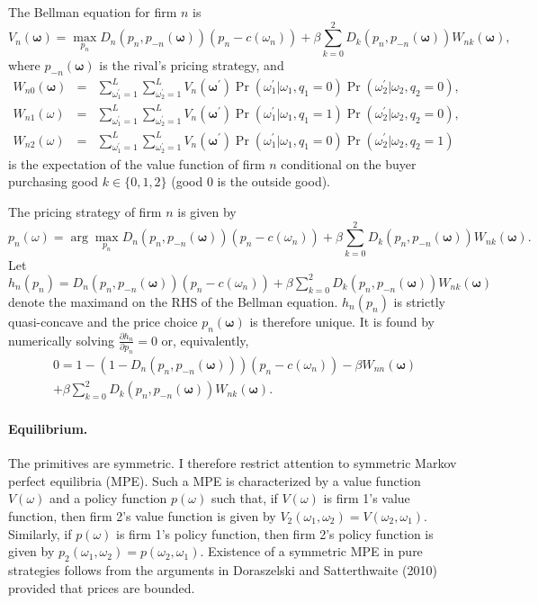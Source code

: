 \documentclass[11pt]{article}
\begin{document}
The Bellman equation for firm $n$ is
\begin{equation*}
V_n(\mathbf{\omega})=\max_{p_n }
D_n(p_n,p_{-n}(\mathbf{\omega}))(p_n-c(\omega_n))+\beta\sum_{k=0}^2D_k(p_n,p_{-n}(\mathbf{\omega}))W_{nk}(\mathbf{\omega}),
\end{equation*}%
where $p_{-n}(\mathbf{\omega})$ is the
rival's pricing strategy, and
\begin{eqnarray*}
W_{n0}(\mathbf{\omega}) & = & \sum_{\omega_1^\prime=1}^L\sum_{\omega_2^\prime=1}^LV_n(\mathbf{\omega}^\prime)\Pr(\omega_1^\prime|\omega_1,q_1=0)\Pr(\omega_2^\prime|\omega_2,q_2=0), \\
W_{n1}(\omega) & = & \sum_{\omega_1^\prime=1}^L\sum_{\omega_2^\prime=1}^LV_n(\mathbf{\omega}^\prime)\Pr(\omega_1^\prime|\omega_1,q_1=1)\Pr(\omega_2^\prime|\omega_2,q_2=0), \\
W_{n2}(\omega) & = & \sum_{\omega_1^\prime=1}^L\sum_{\omega_2^\prime=1}^LV_n(\mathbf{\omega}^\prime)\Pr(\omega_1^\prime|\omega_1,q_1=0)\Pr(\omega_2^\prime|\omega_2,q_2=1)
\end{eqnarray*}
is the expectation of the value function of firm $n$ conditional on the buyer purchasing good $k\in\{0,1,2\}$ (good $0$ is the outside good).

The pricing strategy of firm $n$ is given by
\begin{equation*}
p_n\left( \omega \right)
=\arg\max_{p_n}D_n(p_n,p_{-n}(\mathbf{\omega}))(p_n-c(\omega_n))+\beta\sum_{k=0}^2D_k(p_n,p_{-n}(\mathbf{\omega}))
W_{nk}(\mathbf{\omega}).
\end{equation*}%
Let
$h_n(p_n)=D_n(p_n,p_{-n}(\mathbf{\omega}))(p_n-c(\omega_n))+\beta\sum_{k=0}^2D_k(p_n,p_{-n}(\mathbf{\omega}))W_{nk}(\mathbf{\omega})$
denote the maximand on the RHS of the Bellman equation.
$h_n(p_n)$ is strictly quasi-concave and the price choice $p_n(%
\mathbf{\omega})$ is therefore unique. It is found by numerically solving $\frac{\partial h_n}{\partial p_n}=0$ or, equivalently,
\begin{gather*}
0=1-(1-D_n(p_n,p_{-n}(\mathbf{\omega})))\left(p_n-c(\omega_n)\right)-\beta W_{nn}(\mathbf{\omega})\\
+ \beta\sum_{k=0}^2D_k(p_n,p_{-n}(\mathbf{\omega}))W_{nk}(\mathbf{\omega}).
\end{gather*}

\paragraph{Equilibrium.}

The primitives are symmetric. I therefore restrict attention to
symmetric Markov perfect equilibria (MPE). Such a MPE is
characterized by a value function $V(\omega)$ and a policy function
$p(\omega)$ such that, if $V(\omega)$ is firm 1's value function,
then firm 2's value function is given by
$V_{2}(\omega_1,\omega_2)=V(\omega_2,\omega_1)$. Similarly, if
$p(\omega)$ is firm 1's policy function, then firm 2's policy
function is given by
$p_{2}(\omega_1,\omega_2)=p(\omega_2,\omega_1)$. Existence of a
symmetric MPE in pure strategies follows from the arguments in
Doraszelski and Satterthwaite (2010) provided that prices are bounded.
\end{document}

